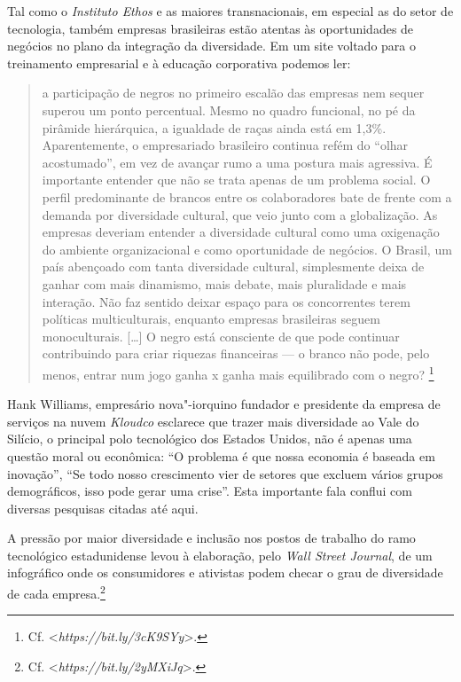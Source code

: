Tal como o \emph{Instituto Ethos} e as maiores transnacionais, em
especial as do setor de tecnologia, também empresas brasileiras estão
atentas às oportunidades de negócios no plano da integração da
diversidade. Em um site voltado para o treinamento empresarial e à
educação corporativa podemos ler:

\begin{quote}
a participação de negros no primeiro escalão das empresas nem sequer
superou um ponto percentual. Mesmo no quadro funcional, no pé da
pirâmide hierárquica, a igualdade de raças ainda está em 1,3\%.
Aparentemente, o empresariado brasileiro continua refém do ``olhar
acostumado'', em vez de avançar rumo a uma postura mais agressiva. É
importante entender que não se trata apenas de um problema social. O
perfil predominante de brancos entre os colaboradores bate de frente com
a demanda por diversidade cultural, que veio junto com a globalização.
As empresas deveriam entender a diversidade cultural como uma oxigenação
do ambiente organizacional e como oportunidade de negócios. O Brasil, um
país abençoado com tanta diversidade cultural, simplesmente deixa de
ganhar com mais dinamismo, mais debate, mais pluralidade e mais
interação. Não faz sentido deixar espaço para os concorrentes terem
políticas multiculturais, enquanto empresas brasileiras seguem
monoculturais. {[}\ldots{}{]} O negro está consciente de que pode continuar
contribuindo para criar riquezas financeiras --- o branco não pode, pelo
menos, entrar num jogo ganha x ganha mais equilibrado com o negro?
\footnote{Cf. \textless{}\emph{https://bit.ly/3cK9SYy}\textgreater{}.}
\end{quote}

Hank Williams, empresário nova"-iorquino fundador e presidente da empresa
de serviços na nuvem \emph{Kloudco} esclarece que trazer mais
diversidade ao Vale do Silício, o principal polo tecnológico dos Estados
Unidos, não é apenas uma questão moral ou econômica: ``O problema é que
nossa economia é baseada em inovação'', ``Se todo nosso crescimento vier
de setores que excluem vários grupos demográficos, isso pode gerar uma
crise''. Esta importante fala conflui com diversas pesquisas citadas até
aqui.

A pressão por maior diversidade e inclusão nos postos de trabalho do
ramo tecnológico estadunidense levou à elaboração, pelo \emph{Wall
Street Journal}, de um infográfico onde os consumidores e ativistas
podem checar o grau de diversidade de cada empresa.\footnote{Cf.
  \textless{}\emph{https://bit.ly/2yMXiJq}\textgreater{}.}

